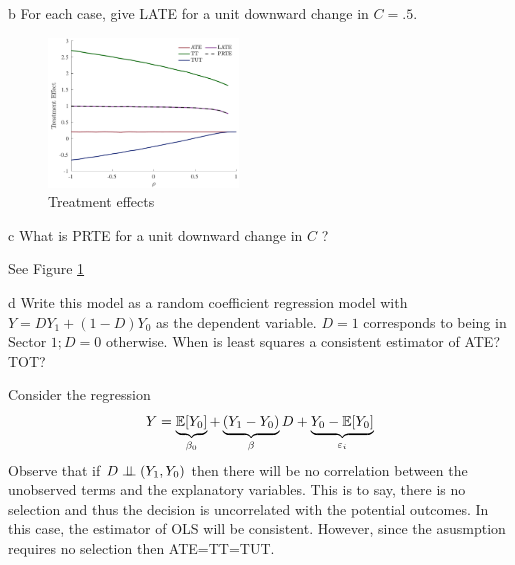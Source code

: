 \documentclass{article}
\begin{document}
\begin{problem}{b}
For each case, give LATE for a unit downward change in $C=.5$.
\end{problem}
\begin{solution}
\begin{figure}[htb]
    \centering
    \includegraphics[width=0.45\textwidth]{ps1Heckman/Figures/treatments.pdf}
    \caption{Treatment effects}
    \label{ps1H:q4:fig2}
\end{figure}\end{solution}
\begin{problem}{c}
What is PRTE for a unit downward change in $C$ ?
\end{problem}
\begin{solution}
See Figure \ref{ps1H:q4:fig2}
\end{solution}
\begin{problem}{d}
Write this model as a random coefficient regression model with $Y=D Y_{1}+(1-D) Y_{0}$ as the dependent variable. $D=1$ corresponds to being in Sector $1 ; D=0$ otherwise. When is least squares a consistent estimator of ATE? TOT?
\end{problem}
\begin{solution}
Consider the regression 
\begin{equation*}
    Y = \underbrace{\mathbb{E}[Y_0]}_{\beta_0} + \underbrace{(Y_1-Y_0)}_{\beta} D + \underbrace{Y_0-\mathbb{E}[Y_0]}_{\varepsilon_i}
\end{equation*}
Observe that if $D\perp\!\!\!\perp(Y_1,Y_0)$ then there will be no correlation between the unobserved terms and the explanatory variables. This is to say, there is no selection and thus the decision is uncorrelated with the potential outcomes. In this case, the estimator of OLS will be consistent. However, since the asusmption requires no selection then ATE=TT=TUT. 
\end{solution}


\newpage
\end{document}
